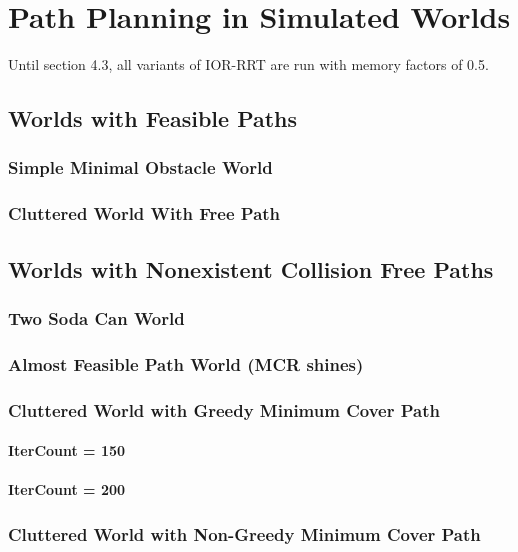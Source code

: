 \chapter{Path Planning in Simulated Worlds}
Until section 4.3, all variants of IOR-RRT are run with memory factors of 0.5.
\section{Worlds with Feasible Paths}

\subsection{Simple Minimal Obstacle World}

\subsection{Cluttered World With Free Path}

\section{Worlds with Nonexistent Collision Free Paths}

\subsection{Two Soda Can World}

\subsection{Almost Feasible Path World (MCR shines)}

\subsection{Cluttered World with Greedy Minimum Cover Path}
\subsubsection{IterCount = 150}
\subsubsection{IterCount = 200}

\subsection{Cluttered World with Non-Greedy Minimum Cover Path}
